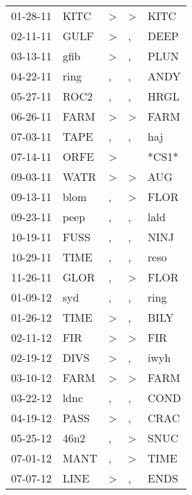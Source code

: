 \begin{supertabular}{lllll}
 01-28-11 &   KITC &     \textgreater &     \textgreater &   KITC \\
 02-11-11 &   GULF &     \textgreater &                , &   DEEP \\
 03-13-11 &   gfib &     \textgreater &                , &   PLUN \\
 04-22-11 &   ring &                , &                , &   ANDY \\
 05-27-11 &   ROC2 &                , &                , &   HRGL \\
 06-26-11 &   FARM &     \textgreater &     \textgreater &   FARM \\
 07-03-11 &   TAPE &                , &                , &    haj \\
 07-14-11 &   ORFE &     \textgreater &                  &  *CS1* \\
 09-03-11 &   WATR &     \textgreater &     \textgreater &    AUG \\
 09-13-11 &   blom &                , &     \textgreater &   FLOR \\
 09-23-11 &   peep &                , &                , &   lald \\
 10-19-11 &   FUSS &                , &                , &   NINJ \\
 10-29-11 &   TIME &                , &                , &   reso \\
 11-26-11 &   GLOR &                , &     \textgreater &   FLOR \\
 01-09-12 &    syd &                , &                , &   ring \\
 01-26-12 &   TIME &     \textgreater &                , &   BILY \\
 02-11-12 &    FIR &     \textgreater &     \textgreater &    FIR \\
 02-19-12 &   DIVS &     \textgreater &                , &   iwyh \\
 03-10-12 &   FARM &     \textgreater &     \textgreater &   FARM \\
 03-22-12 &   ldnc &                , &                , &   COND \\
 04-19-12 &   PASS &     \textgreater &                , &   CRAC \\
 05-25-12 &   46n2 &                , &     \textgreater &   SNUC \\
 07-01-12 &   MANT &                , &     \textgreater &   TIME \\
 07-07-12 &   LINE &     \textgreater &                , &   ENDS \\

\end{supertabular}
